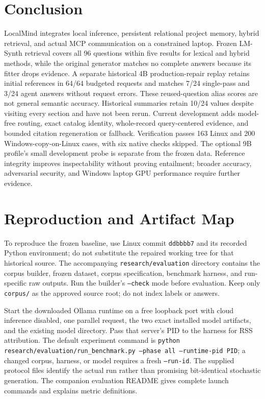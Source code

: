 \documentclass[conference,letterpaper]{IEEEtran}
\newcommand{\code}[1]{\texttt{#1}}
\begin{document}
\section{Conclusion}
LocalMind integrates local inference, persistent relational project memory, hybrid retrieval, and actual MCP communication on a constrained laptop. Frozen LM-Synth retrieval covers all 96 questions within five results for lexical and hybrid methods, while the original generator matches no complete answers because its fitter drops evidence. A separate historical 4B production-repair replay retains initial references in 64/64 budgeted requests and matches 7/24 single-pass and 3/24 agent answers without request errors. These reused-question alias scores are not general semantic accuracy. Historical summaries retain 10/24 values despite visiting every section and have not been rerun. Current development adds model-free routing, exact catalog identity, whole-record query-centered evidence, and bounded citation regeneration or fallback. Verification passes 163 Linux and 200 Windows-copy-on-Linux cases, with six native checks skipped. The optional 9B profile's small development probe is separate from the frozen data. Reference integrity improves inspectability without proving entailment; broader accuracy, adversarial security, and Windows laptop GPU performance require further evidence.

\appendices
\section{Reproduction and Artifact Map}
\label{app:reproduction}
To reproduce the frozen baseline, use Linux commit \code{ddbbbb7} and its recorded Python environment; do not substitute the repaired working tree for that historical source. The accompanying \code{research/evaluation} directory contains the corpus builder, frozen dataset, corpus specification, benchmark harness, and run-specific raw outputs. Run the builder's \code{--check} mode before evaluation. Keep only \code{corpus/} as the approved source root; do not index labels or answers.

Start the downloaded Ollama runtime on a free loopback port with cloud inference disabled, one parallel request, the two exact installed model artifacts, and the existing model directory. Pass that server's PID to the harness for RSS attribution. The default experiment command is \code{python research/evaluation/run\_benchmark.py --phase all --runtime-pid PID}; a changed corpus, harness, or model requires a fresh \code{--run-id}. The supplied protocol files identify the actual run rather than promising bit-identical stochastic generation. The companion evaluation README gives complete launch commands and explains metric definitions.
\end{document}
